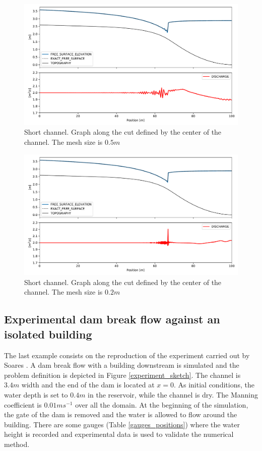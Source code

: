 \documentclass[a4paper,12pt]{article}
\begin{document}
\begin{figure}
    \centering
    \includegraphics[width=\textwidth]{img/jump/mesh_0.5.pdf}
    \caption{Short channel. Graph along the cut defined by the center of the channel. The mesh size is $0.5m$}
    \label{mac_donald_shock_graph_5}
\end{figure}

\begin{figure}
    \centering
    \includegraphics[width=\textwidth]{img/jump/mesh_0.2.pdf}
    \caption{Short channel. Graph along the cut defined by the center of the channel. The mesh size is $0.2m$}
    \label{mac_donald_shock_graph_2}
\end{figure}


\subsection{Experimental dam break flow against an isolated building}

The last example consists on the reproduction of the experiment carried out by Soares \cite{soares2007}.
A dam break flow with a building downstream is simulated and the problem definition is depicted in Figure \ref{experiment_sketch}. The channel is $3.4m$ width and the end of the dam is located at $x=0$.
As initial conditions, the water depth is set to $0.4m$ in the reservoir, while the channel is dry. The Manning coefficient is $0.01ms^{-1}$ over all the domain.
At the beginning of the simulation, the gate of the dam is removed and the water is allowed to flow around the building.
There are some gauges (Table \ref{gauges_positions}) where the water height is recorded and experimental data is used to validate the numerical method.
\end{document}
